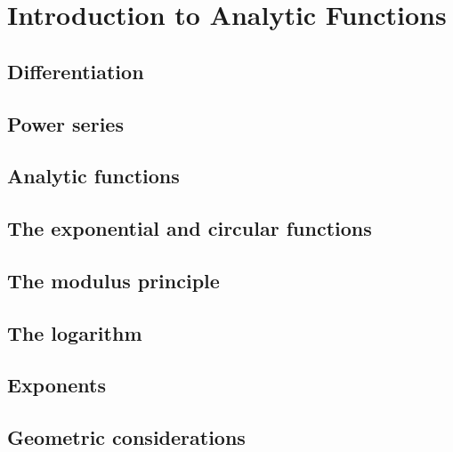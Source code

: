 \chapter{Introduction to Analytic Functions}
\section{Differentiation}
\section{Power series}
\section{Analytic functions}
\section{The exponential and circular functions}
\section{The modulus principle}
\section{The logarithm}
\section{Exponents}
\section{Geometric considerations}